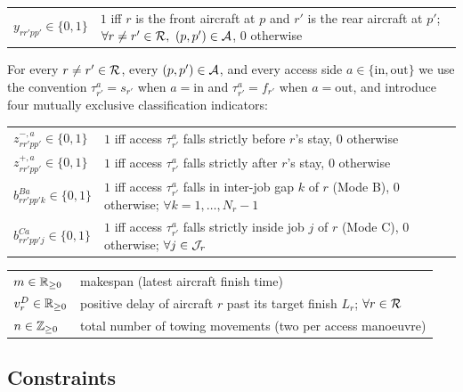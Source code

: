 
\begin{tabular}{@{}l@{\quad}p{}@{}}
  $y_{rr'pp'} \in \{0,1\}$
    & $1$ iff $r$ is the front aircraft at $p$ and $r'$ is the rear
      aircraft at $p'$;
      $\forall r \ne r' \in \mathcal{R},\ (p, p') \in \mathcal{A}$, 0 otherwise \\
\end{tabular}

For every $r \ne r' \in \mathcal{R}$, every $(p, p') \in \mathcal{A}$, and every
access side $a \in \{\mathrm{in}, \mathrm{out}\}$ we use the convention
$\tau^a_{r'} = s_{r'}$ when $a = \mathrm{in}$ and $\tau^a_{r'} = f_{r'}$
when $a = \mathrm{out}$, and introduce four mutually exclusive
classification indicators:

\begin{tabular}{@{}l@{\quad}p{}@{}}
  $z^{-,a}_{rr'pp'} \in \{0,1\}$
    & $1$ iff access $\tau^a_{r'}$ falls strictly before $r$'s stay, 0 otherwise \\
  $z^{+,a}_{rr'pp'} \in \{0,1\}$
    & $1$ iff access $\tau^a_{r'}$ falls strictly after $r$'s stay, 0 otherwise \\
  $b^{Ba}_{rr'pp'k} \in \{0,1\}$
    & $1$ iff access $\tau^a_{r'}$ falls in inter-job gap $k$ of $r$
      (Mode B), 0 otherwise; $\forall k = 1, \ldots, N_r-1$ \\
  $b^{Ca}_{rr'pp'j} \in \{0,1\}$
    & $1$ iff access $\tau^a_{r'}$ falls strictly inside job $j$ of $r$
      (Mode C), 0 otherwise; $\forall j \in \mathcal{J}_r$ \\
\end{tabular}


\begin{tabular}{@{}l@{\quad}p{}@{}}
  $m \in \mathbb{R}_{\geq 0}$
    & makespan (latest aircraft finish time) \\
  $v^D_r \in \mathbb{R}_{\geq 0}$
    & positive delay of aircraft $r$ past its target finish $L_r$;
      $\forall r \in \mathcal{R}$ \\
  $n \in \mathbb{Z}_{\geq 0}$
    & total number of towing movements (two per access manoeuvre) \\
\end{tabular}

\subsection*{Constraints}

